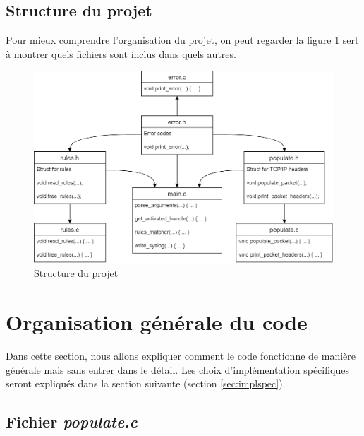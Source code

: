 \documentclass[a4paper]{article}
\begin{document}
\subsection{Structure du projet}



Pour mieux comprendre l'organisation du projet, on peut regarder la figure \ref{fig:structproj} sert à montrer quels fichiers sont inclus dans quels autres.

\begin{figure}[H]
    \centering
    \includegraphics[width=0.90\linewidth]{../markdown-explanations/images/project-structure.png}
    \caption{Structure du projet}
    \label{fig:structproj}
\end{figure}










\section{Organisation générale du code}



Dans cette section, nous allons expliquer comment le code fonctionne de manière générale mais sans entrer dans le détail. Les choix d'implémentation spécifiques seront expliqués dans la section suivante (section \ref{sec:implspec}).





\subsection{Fichier \textit{populate.c}}
\end{document}
